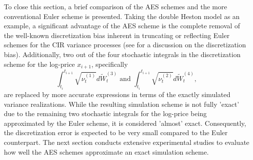 \documentclass[]{interact}
\theoremstyle{plain}%
\theoremstyle{definition}
\theoremstyle{remark}
\begin{document}
To close this section, a brief comparison of the AES schemes and the more conventional Euler scheme is presented. Taking the double Heston model as an example, a significant advantage of the AES scheme is the complete removal of the well-known discretization bias inherent in truncating or reflecting Euler schemes for the CIR variance processes (see \cite{lordetal} for a discussion on the discretization bias). Additionally, two out of the four stochastic integrals in the discretization scheme for the log-price $x_{i+1}$, specifically 
$$
\int_{t_{i}}^{t_{i+1}} \sqrt{\nu_{t}^{(1)}} d \widetilde{W}_t^{(3)} \text{ and } \int_{t_{i}}^{t_{i+1}} \sqrt{\nu_{t}^{(2)}} d \widetilde{W}_t^{(4)},$$ 
are replaced by more accurate expressions in terms of the exactly simulated variance realizations. While the resulting simulation scheme is not fully 'exact' due to the remaining two stochastic integrals for the log-price being approximated by the Euler scheme, it is considered 'almost' exact. Consequently, the discretization error is expected to be very small compared to the Euler counterpart. The next section conducts extensive experimental studies to evaluate how well the AES schemes approximate an exact simulation scheme.



\end{document}
